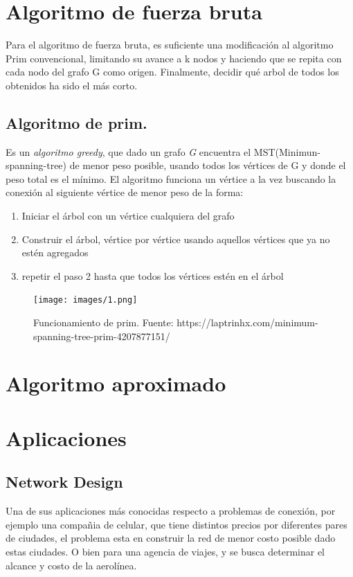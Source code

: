 \documentclass[spanish,12pt]{elsarticle}
\begin{document}
 
\section{Algoritmo de fuerza bruta}
Para el algoritmo de fuerza bruta, es suficiente una modificación al algoritmo Prim convencional, limitando su avance a k nodos y haciendo que se repita con cada nodo del grafo G como origen. Finalmente, decidir qué arbol de todos los obtenidos ha sido el más corto.
\clearpage
\subsection{Algoritmo de prim.}
Es un \textit{algoritmo greedy}, que dado un grafo \textit{G}  encuentra el MST(Minimun-spanning-tree) de menor peso posible, usando todos los vértices de G y donde el peso total es el mínimo. El algoritmo funciona un vértice a la vez buscando la conexión al siguiente vértice de menor peso de la forma:\\



\begin{enumerate}
    \item  Iniciar el árbol con un vértice cualquiera del grafo
    \item  Construir el árbol, vértice por vértice usando aquellos vértices que ya no estén agregados
    \item repetir el paso 2 hasta que todos los vértices estén en el árbol

\end{enumerate}

\begin{figure}[h]
    \centering
    \texttt{[image: images/1.png]}
    \caption{Funcionamiento de prim. Fuente: https://laptrinhx.com/minimum-spanning-tree-prim-4207877151/ }
    \label{fig:my_label}
\end{figure}





\section{Algoritmo aproximado}

\section{Aplicaciones}
\subsection{Network Design}
Una de sus aplicaciones más conocidas respecto a problemas de conexión, por ejemplo una compañia de celular, que tiene distintos precios por diferentes pares de ciudades, el problema esta en construir la red de menor costo posible dado estas ciudades. O bien para una agencia de viajes, y se busca determinar el alcance y costo de la aerolínea.
\end{document}
